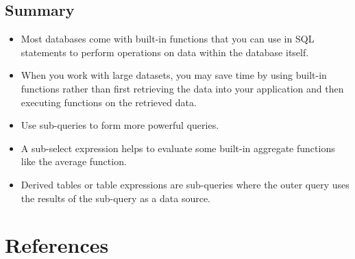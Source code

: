 \documentclass[
  letterpaper,
  DIV=11,
  numbers=noendperiod]{scrreprt}
\newlength{\cslhangindent}
\newlength{\cslentryspacingunit} %
\newenvironment{CSLReferences}[2] %
 {%
  \setlength{\parindent}{0pt}
  \ifodd #1
  \let\oldpar\par
  \def\par{\hangindent=\cslhangindent\oldpar}
  \fi
  \setlength{\parskip}{#2\cslentryspacingunit}
 }%
 {}
\begin{document}
\hypertarget{summary}{%
\section{Summary}\label{summary}}

\begin{itemize}
\item
  Most databases come with built-in functions that you can use in SQL
  statements to perform operations on data within the database itself.
\item
  When you work with large datasets, you may save time by using built-in
  functions rather than first retrieving the data into your application
  and then executing functions on the retrieved data.
\item
  Use sub-queries to form more powerful queries.
\item
  A sub-select expression helps to evaluate some built-in aggregate
  functions like the average function.
\item
  Derived tables or table expressions are sub-queries where the outer
  query uses the results of the sub-query as a data source.
\end{itemize}


\hypertarget{references}{%
\chapter*{References}\label{references}}


\hypertarget{refs}{}
\begin{CSLReferences}{0}{0}
\end{CSLReferences}
\end{document}
